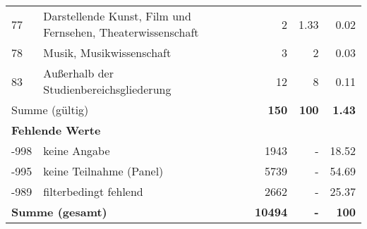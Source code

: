 \begin{longtable}{lXrrr}
        77 & \multicolumn{1}{X}{Darstellende Kunst, Film und Fernsehen, Theaterwissenschaft} & %
          \num{2} &
          \num[round-mode=places,round-precision=2]{1.33} &
          \num[round-mode=places,round-precision=2]{0.02} \\

        78 & \multicolumn{1}{X}{Musik, Musikwissenschaft} & %
          \num{3} &
          \num[round-mode=places,round-precision=2]{2} &
          \num[round-mode=places,round-precision=2]{0.03} \\

        83 & \multicolumn{1}{X}{Außerhalb der Studienbereichsgliederung} & %
          \num{12} &
          \num[round-mode=places,round-precision=2]{8} &
          \num[round-mode=places,round-precision=2]{0.11} \\

     \midrule
     \multicolumn{2}{l}{Summe (gültig)} &
       \textbf{\num{150}} &
     \textbf{\num{100}} &
       \textbf{\num[round-mode=places,round-precision=2]{1.43}} \\
     \multicolumn{5}{l}{\textbf{Fehlende Werte}}\\
       -998 &
       keine Angabe &
         \num{1943} &
        - &
         \num[round-mode=places,round-precision=2]{18.52} \\
       -995 &
       keine Teilnahme (Panel) &
         \num{5739} &
        - &
         \num[round-mode=places,round-precision=2]{54.69} \\
       -989 &
       filterbedingt fehlend &
         \num{2662} &
        - &
         \num[round-mode=places,round-precision=2]{25.37} \\
     \midrule
     \multicolumn{2}{l}{\textbf{Summe (gesamt)}} &
          \textbf{\num{10494}} &
        \textbf{-} &
        \textbf{\num{100}} \\
     \bottomrule
     \end{longtable}
     
